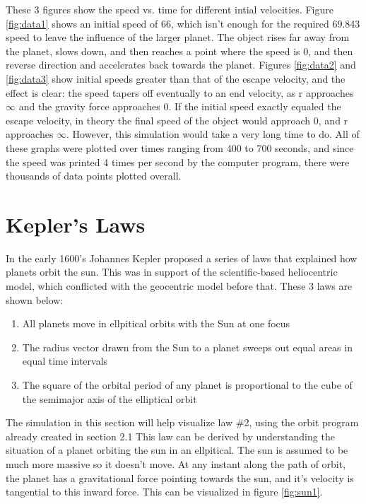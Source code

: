 These 3 figures show the speed vs. time for different intial velocities.  Figure \ref{fig:data1} shows an initial speed of 66, which isn't enough for the required 69.843 speed to leave the influence of the larger planet.  The object rises far away from the planet, slows down, and then reaches a point where the speed is 0, and then reverse direction and accelerates back towards the planet.  Figures \ref{fig:data2} and \ref{fig:data3} show initial speeds greater than that of the escape velocity, and the effect is clear: the speed tapers off eventually to an end velocity, as r approaches $\infty$ and the gravity force approaches 0.  If the initial speed exactly equaled the escape velocity, in theory the final speed of the object would approach 0, and r approaches $\infty$.  However, this simulation would take a very long time to do.  All of these graphs were plotted over times ranging from 400 to 700 seconds, and since the speed was printed 4 times per second by the computer program, there were thousands of data points plotted overall. 





\section{Kepler's Laws}




In the early 1600's Johannes Kepler proposed a series of laws that explained how planets orbit the sun.  This was in support of the scientific-based heliocentric model, which conflicted with the geocentric model before that.  These 3 laws are shown below:



\begin{enumerate}
\item All planets move in ellpitical orbits with the Sun at one focus
\item The radius vector drawn from the Sun to a planet sweeps out equal areas in equal time intervals
\item The square of the orbital period of any planet is proportional to the cube of the semimajor axis of the elliptical orbit
\end{enumerate}

The simulation in this section will help visualize law \#2, using the orbit program already created in section 2.1  This law can be derived by understanding the situation of a planet orbiting the sun in an ellpitical.  The sun is assumed to be much more massive so it doesn't move.  At any instant along the path of orbit, the planet has a gravitational force pointing towards the sun, and it's velocity is tangential to this inward force.  This can be visualized in figure \ref{fig:sun1}.  


